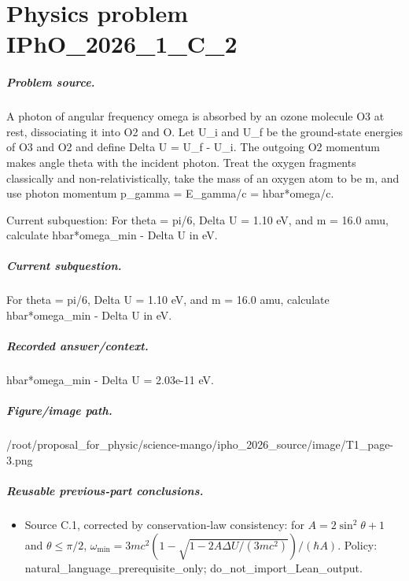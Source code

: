 
\chapter{Physics problem IPhO\_2026\_1\_C\_2}
\label{ch:IPhO2026Problems_problem_IPhO_2026_1_C_2}

\paragraph{Problem source.}
A photon of angular frequency omega is absorbed by an ozone molecule O3 at rest,
dissociating it into O2 and O.  Let U\_i and U\_f be the ground-state energies of
O3 and O2 and define Delta U = U\_f - U\_i.  The outgoing O2 momentum makes angle
theta with the incident photon.  Treat the oxygen fragments classically and
non-relativistically, take the mass of an oxygen atom to be m, and use photon
momentum p\_gamma = E\_gamma/c = hbar*omega/c.

Current subquestion:
For theta = pi/6, Delta U = 1.10 eV, and m = 16.0 amu, calculate hbar*omega\_min - Delta U in eV.

\paragraph{Current subquestion.}
For theta = pi/6, Delta U = 1.10 eV, and m = 16.0 amu, calculate hbar*omega\_min - Delta U in eV.

\paragraph{Recorded answer/context.}
hbar*omega\_min - Delta U = 2.03e-11 eV.

\paragraph{Figure/image path.}
/root/proposal\_for\_physic/science-mango/ipho\_2026\_source/image/T1\_page-3.png

\paragraph{Reusable previous-part conclusions.}
\begin{itemize}
\item Source C.1, corrected by conservation-law consistency: for
  \(A=2\sin^2\theta+1\) and \(\theta\leq\pi/2\),
  \(\omega_{\min}=3mc^2(1-\sqrt{1-2A\Delta U/(3mc^2)})/(\hbar A)\).
  Policy: natural\_language\_prerequisite\_only; do\_not\_import\_Lean\_output.
\end{itemize}

